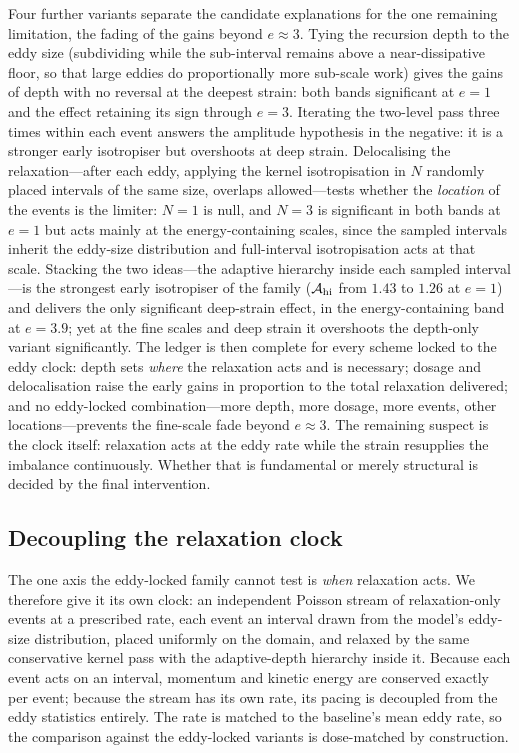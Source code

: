 \documentclass[11pt,a4paper]{article}
\begin{document}
Four further variants separate the candidate explanations for the one
remaining limitation, the fading of the gains beyond $e\approx3$. Tying
the recursion depth to the eddy size (subdividing while the sub-interval
remains above a near-dissipative floor, so that large eddies do
proportionally more sub-scale work) gives the gains of depth with no
reversal at the deepest strain: both bands significant at $e=1$ and the
effect retaining its sign through $e=3$. Iterating the two-level pass
three times within each event answers the amplitude hypothesis in the
negative: it is a stronger early isotropiser but overshoots at deep
strain. Delocalising the relaxation---after each eddy, applying the
kernel isotropisation in $N$ randomly placed intervals of the same size,
overlaps allowed---tests whether the \emph{location} of the events is
the limiter: $N=1$ is null, and $N=3$ is significant in both bands at
$e=1$ but acts mainly at the energy-containing scales, since the sampled
intervals inherit the eddy-size distribution and full-interval
isotropisation acts at that scale. Stacking the two ideas---the adaptive
hierarchy inside each sampled interval---is the strongest early
isotropiser of the family ($\mathcal A_{\rm hi}$ from $1.43$ to $1.26$
at $e=1$) and delivers the only significant deep-strain effect, in the
energy-containing band at $e=3.9$; yet at the fine scales and deep
strain it overshoots the depth-only variant significantly. The ledger
is then complete for every scheme locked to the eddy clock: depth sets
\emph{where} the relaxation acts and is necessary; dosage and
delocalisation raise the early gains in proportion to the total
relaxation delivered; and no eddy-locked combination---more depth, more
dosage, more events, other locations---prevents the fine-scale fade
beyond $e\approx3$. The remaining suspect is the clock itself:
relaxation acts at the eddy rate while the strain resupplies the
imbalance continuously. Whether that is fundamental or merely
structural is decided by the final intervention.

\subsection{Decoupling the relaxation clock}\label{sec:clock}

The one axis the eddy-locked family cannot test is \emph{when}
relaxation acts. We therefore give it its own clock: an independent
Poisson stream of relaxation-only events at a prescribed rate, each
event an interval drawn from the model's eddy-size distribution, placed
uniformly on the domain, and relaxed by the same conservative kernel
pass with the adaptive-depth hierarchy inside it. Because each event
acts on an interval, momentum and kinetic energy are conserved exactly
per event; because the stream has its own rate, its pacing is decoupled
from the eddy statistics entirely. The rate is matched to the
baseline's mean eddy rate, so the comparison against the eddy-locked
variants is dose-matched by construction.
\end{document}

